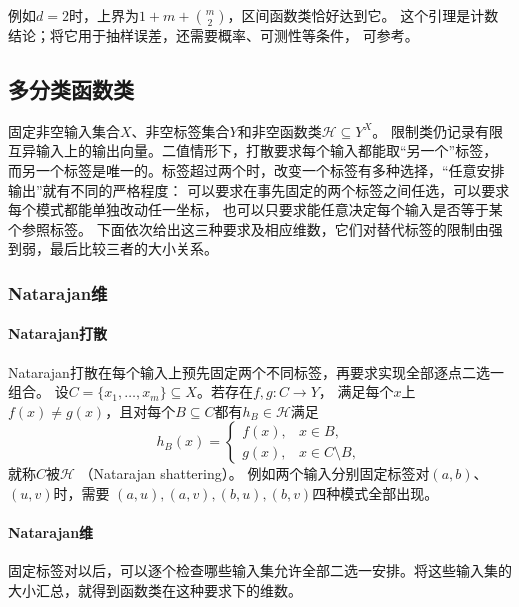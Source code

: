 例如$d=2$时，上界为$1+m+\binom m2$，区间函数类恰好达到它。
这个引理是计数结论；将它用于抽样误差，还需要概率、可测性等条件，
可参考。

\subsection{多分类函数类}
\label{sec:comb-multiclass-dimensions}

固定非空输入集合$X$、非空标签集合$Y$和非空函数类$\mathcal H\subseteq Y^X$。
限制类仍记录有限互异输入上的输出向量。二值情形下，打散要求每个输入都能取“另一个”标签，
而另一个标签是唯一的。标签超过两个时，改变一个标签有多种选择，“任意安排输出”就有不同的严格程度：
可以要求在事先固定的两个标签之间任选，可以要求每个模式都能单独改动任一坐标，
也可以只要求能任意决定每个输入是否等于某个参照标签。
下面依次给出这三种要求及相应维数，它们对替代标签的限制由强到弱，最后比较三者的大小关系。

\subsubsection{Natarajan维}
\label{sec:comb-fixed-label-pairs}

\paragraph{Natarajan打散}

Natarajan打散在每个输入上预先固定两个不同标签，再要求实现全部逐点二选一组合。
设$C=\{x_1,\ldots,x_m\}\subseteq X$。若存在$f,g:C\to Y$，
满足每个$x$上$f(x)\neq g(x)$，且对每个$B\subseteq C$都有$h_B\in\mathcal H$满足
\begin{equation}
 h_B(x)=\begin{cases}f(x),&x\in B,\\g(x),&x\in C\setminus B,\end{cases}
 \label{eq:natarajan-shattering}
\end{equation}
就称$C$被$\mathcal H$ （Natarajan shattering）。
例如两个输入分别固定标签对$(a,b)$、$(u,v)$时，需要
$(a,u),(a,v),(b,u),(b,v)$四种模式全部出现。

\paragraph{Natarajan维}

固定标签对以后，可以逐个检查哪些输入集允许全部二选一安排。将这些输入集的大小汇总，就得到函数类在这种要求下的维数。

